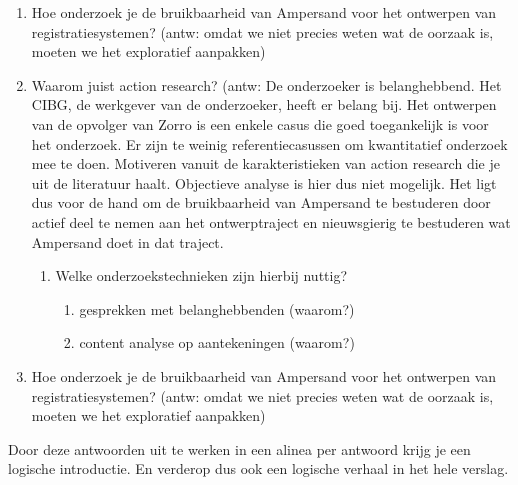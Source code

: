 \begin{enumerate}


    \item Hoe onderzoek je de bruikbaarheid van Ampersand voor het ontwerpen van registratiesystemen? (antw: omdat we niet precies weten wat de oorzaak is, moeten we het exploratief aanpakken)
    \item Waarom juist action research? (antw: De onderzoeker is belanghebbend. Het CIBG, de werkgever van de onderzoeker, heeft er belang bij. Het ontwerpen van de opvolger van Zorro is een enkele casus die goed toegankelijk is voor het onderzoek. Er zijn te weinig referentiecasussen om kwantitatief onderzoek mee te doen. Motiveren vanuit de karakteristieken van action research die je uit de literatuur haalt. Objectieve analyse is hier dus niet mogelijk. Het ligt dus voor de hand om de bruikbaarheid van Ampersand te bestuderen door actief deel te nemen aan het ontwerptraject en nieuwsgierig te bestuderen wat Ampersand doet in dat traject.
    \begin{enumerate}
        \item Welke onderzoekstechnieken zijn hierbij nuttig?
        \begin{enumerate}
            \item gesprekken met belanghebbenden (waarom?)
            \item content analyse op aantekeningen (waarom?)
        \end{enumerate}
    \end{enumerate}
    \item Hoe onderzoek je de bruikbaarheid van Ampersand voor het ontwerpen van registratiesystemen? (antw: omdat we niet precies weten wat de oorzaak is, moeten we het exploratief aanpakken)
\end{enumerate}
Door deze antwoorden uit te werken in een alinea per antwoord krijg je een logische introductie. En verderop dus ook een logische verhaal in het hele verslag.